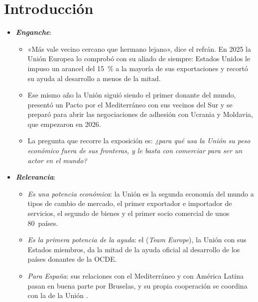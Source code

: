 \documentclass[11pt]{article}
\begin{document}
\tceetitulo

\section*{Introducción}

\begin{itemize}
\item \textbf{\emph{Enganche}}:
  \begin{itemize}
  \item «Más vale vecino cercano que hermano lejano», dice el refrán. En 2025 la Unión Europea lo comprobó con su aliado de siempre: Estados Unidos le impuso un arancel del 15~\% a la mayoría de sus exportaciones y recortó su ayuda al desarrollo a menos de la mitad\nocite{UE2025DeclaracionEEUU,OCDE2026AODPreliminar}.
  \item Ese mismo año la Unión siguió siendo el primer donante del mundo, presentó un Pacto por el Mediterráneo con sus vecinos del Sur y se preparó para abrir las negociaciones de adhesión con Ucrania y Moldavia, que empezaron en 2026\nocite{CE2025PactoMediterraneo,CE2026PaqueteAmpliacion}.
  \item La pregunta que recorre la exposición es: \emph{¿para qué usa la Unión su peso económico fuera de sus fronteras, y le basta con comerciar para ser un actor en el mundo?}
  \end{itemize}

\item \textbf{\emph{Relevancia}}:
  \begin{itemize}
  \item \emph{Es una potencia económica}: la Unión es la segunda economía del mundo a tipos de cambio de mercado, el primer exportador e importador de servicios, el segundo de bienes y el primer socio comercial de unos 80~países.
  \item \emph{Es la primera potencia de la ayuda}: el  (\emph{Team Europe}), la Unión con sus Estados miembros, da la mitad de la ayuda oficial al desarrollo de los países donantes de la OCDE.
  \item \emph{Para España}: sus relaciones con el Mediterráneo y con América Latina pasan en buena parte por Bruselas, y su propia cooperación se coordina con la de la Unión .
  \end{itemize}


\end{itemize}
\end{document}
